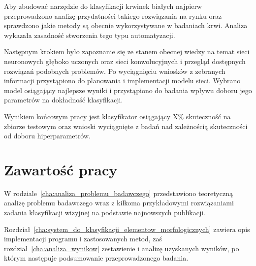 Aby zbudować narzędzie do klasyfikacji krwinek białych najpierw przeprowadzono analizę przydatności takiego rozwiązania na rynku oraz sprawdzono jakie metody są obecnie wykorzystywane w badaniach krwi. Analiza wykazała zasadność stworzenia tego typu automatyzacji.

Następnym krokiem było zapoznanie się ze stanem obecnej wiedzy na temat sieci neuronowych głęboko uczonych oraz sieci konwolucyjnych i przegląd dostępnych rozwiązań podobnych problemów. Po wyciągnięciu wniosków z zebranych informacji przystąpiono do planowania i implementacji modelu sieci. Wybrano model osiągający najlepsze wyniki i przystąpiono do badania wpływu doboru jego parametrów na dokładność klasyfikacji.

Wynikiem końcowym pracy jest klasyfikator osiągający X\% skuteczność na zbiorze testowym oraz wnioski wyciągnięte z badań nad zależnością skuteczności od doboru hiperparametrów.

\section{Zawartość pracy}
\label{sec:zawartosc_pracy}

W rodziale~\ref{cha:analiza_problemu_badawczego} przedstawiono teoretyczną analizę problemu badawczego wraz z kilkoma przykładowymi rozwiązaniami zadania klasyfikacji wizyjnej na podstawie najnowszych publikacji. 

Rozdział~\ref{cha:system_do_klasyfikacji_elementow_morfologicznych} zawiera opis implementacji programu i zastosowanych metod, zaś rozdział~\ref{cha:analiza_wynikow} zestawienie i analizę uzyskanych wyników, po którym następuje podsumowanie przeprowadzonego badania.
